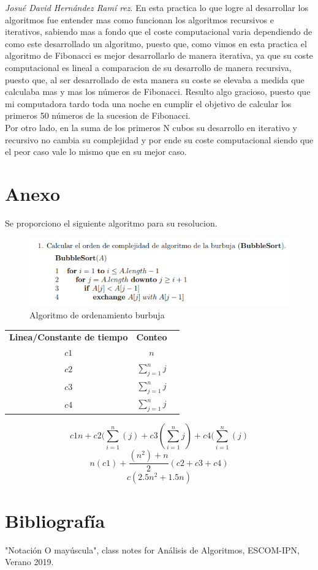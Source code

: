 \documentclass[12pt,twoside]{article}
\begin{document}
\textit{Josu\'e David Hern\'andez Ram\'i rez}. En esta pr\’actica lo que logre al desarrollar los algoritmos fue entender mas como funcionan los algoritmos recursivos e iterativos, sabiendo mas a fondo que el coste computacional varia dependiendo de como este desarrollado un algoritmo, puesto que, como vimos en esta pr\’actica el algoritmo de Fibonacci es mejor desarrollarlo de manera iterativa, ya que su coste computacional es lineal a comparaci\’on de su desarrollo de manera recursiva, puesto que, al ser desarrollado de esta manera su coste se elevaba a medida que calculaba m\’as y m\’as los números de Fibonacci. Result\’o algo gracioso, puesto que mi computadora tard\’o toda una noche en cumplir el objetivo de calcular los primeros 50 números de la sucesi\’on de Fibonacci.\\
Por otro lado, en la suma de los primeros N cubos su desarrollo en iterativo y recursivo no cambia su complejidad y por ende su coste computacional siendo que el peor caso vale lo mismo que en su mejor caso.
 

\section{Anexo}
Se proporciono el siguiente algoritmo para su resolucion.
\begin{figure}[ht]
    \centering
    \includegraphics{anexo_2.png}
    \caption{Algoritmo de ordenamiento burbuja}
    \label{fig:bubble_sort}
\end{figure}
\begin{center}
\begin{tabular}{ | c | c | c | } 
 \hline
 \textbf{Linea/Constante de tiempo} & \textbf{Conteo} \\ 
 $c1$ & $n$ \\
 $c2$ & $\sum_{j=1}^{n} j$ \\
 $c3$ & $\sum_{j=1}^{n} j$ \\
 $c4$ & $\sum_{j=1}^{n} j$ \\
 \hline
\end{tabular}
\end{center}
\begin{figure}
    \centering
    \begin{equation}
        c1n+c2(\sum_{i=1}^{n}( j)+c3(\sum_{i=1}^{n} j)+c4(\sum_{i=1}^{n} (j)
    \end{equation}
    \begin{equation}
        n(c1)+\frac{(n^2)+ n}{2}(c2+c3+c4)
    \end{equation}
    \begin{equation}
        c(2.5n^2 + 1.5n)
    \end{equation}
    \label{eq:desarrollo_complejidad}
\end{figure}
\newpage
\vfill
\clearpage
\section{Bibliograf\'ia}
"Notaci\'on O may\'uscula", class notes for An\'alisis de Algoritmos, ESCOM-IPN, Verano 2019.
\end{document}
